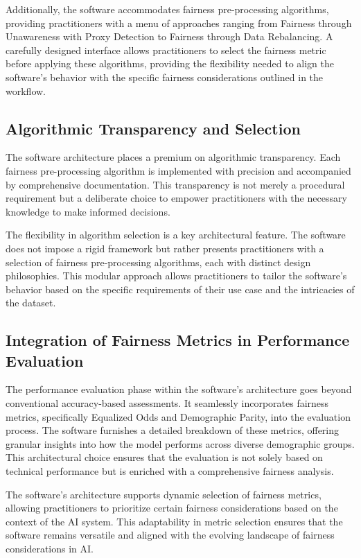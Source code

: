 Additionally, the software accommodates fairness pre-processing algorithms, providing practitioners with a menu of approaches ranging from Fairness through Unawareness with Proxy Detection to Fairness through Data Rebalancing. A carefully designed interface allows practitioners to select the fairness metric before applying these algorithms, providing the flexibility needed to align the software's behavior with the specific fairness considerations outlined in the workflow.

\subsection{Algorithmic Transparency and Selection}

The software architecture places a premium on algorithmic transparency. Each fairness pre-processing algorithm is implemented with precision and accompanied by comprehensive documentation. This transparency is not merely a procedural requirement but a deliberate choice to empower practitioners with the necessary knowledge to make informed decisions.

The flexibility in algorithm selection is a key architectural feature. The software does not impose a rigid framework but rather presents practitioners with a selection of fairness pre-processing algorithms, each with distinct design philosophies. This modular approach allows practitioners to tailor the software's behavior based on the specific requirements of their use case and the intricacies of the dataset.

\subsection{Integration of Fairness Metrics in Performance Evaluation}

The performance evaluation phase within the software's architecture goes beyond conventional accuracy-based assessments. It seamlessly incorporates fairness metrics, specifically Equalized Odds and Demographic Parity, into the evaluation process. The software furnishes a detailed breakdown of these metrics, offering granular insights into how the model performs across diverse demographic groups. This architectural choice ensures that the evaluation is not solely based on technical performance but is enriched with a comprehensive fairness analysis.

The software's architecture supports dynamic selection of fairness metrics, allowing practitioners to prioritize certain fairness considerations based on the context of the AI system. This adaptability in metric selection ensures that the software remains versatile and aligned with the evolving landscape of fairness considerations in AI.

